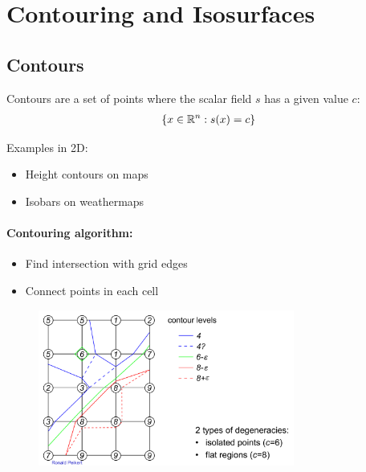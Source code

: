 \section{Contouring and Isosurfaces}

\subsection{Contours}
Contours are a set of points where the scalar field $s$ has a given value $c$:
\begin{align*}
    \left\{ x\in \mathbb{R}^n: s(x) = c\right\}
\end{align*}

Examples in 2D:
\begin{itemize}
    \item Height contours on maps
    \item Isobars on weathermaps
\end{itemize}

\paragraph{Contouring algorithm:}
\begin{itemize}
    \item Find intersection with grid edges
    \item Connect points in each cell
\end{itemize}

\begin{figure}[H]
    \centering
    \includegraphics[width=0.75\textwidth]{img/02_contouring_example}
\end{figure}

